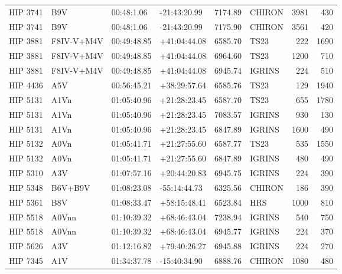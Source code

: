 \documentclass{emulateapj}
\begin{document}
\begin{longtable*}{|l|lllrlrr|}
    HIP 3741 &            B9V &     00:48:1.06 &   -21:43:20.99 &  7174.89 &     CHIRON &     3981 &     430 \\
    HIP 3741 &            B9V &     00:48:1.06 &   -21:43:20.99 &  7175.90 &     CHIRON &     3561 &     420 \\
    HIP 3881 &     F8IV-V+M4V &    00:49:48.85 &   +41:04:44.08 &  6585.70 &       TS23 &      222 &    1690 \\
    HIP 3881 &     F8IV-V+M4V &    00:49:48.85 &   +41:04:44.08 &  6964.60 &       TS23 &     1200 &     710 \\
    HIP 3881 &     F8IV-V+M4V &    00:49:48.85 &   +41:04:44.08 &  6945.74 &     IGRINS &      224 &     510 \\
    HIP 4436 &            A5V &    00:56:45.21 &   +38:29:57.64 &  6585.76 &       TS23 &      129 &    1940 \\
    HIP 5131 &           A1Vn &    01:05:40.96 &   +21:28:23.45 &  6587.70 &       TS23 &      655 &    1780 \\
    HIP 5131 &           A1Vn &    01:05:40.96 &   +21:28:23.45 &  7083.57 &     IGRINS &      930 &     130 \\
    HIP 5131 &           A1Vn &    01:05:40.96 &   +21:28:23.45 &  6847.89 &     IGRINS &     1600 &     490 \\
    HIP 5132 &           A0Vn &    01:05:41.71 &   +21:27:55.60 &  6587.77 &       TS23 &      535 &    1550 \\
    HIP 5132 &           A0Vn &    01:05:41.71 &   +21:27:55.60 &  6847.89 &     IGRINS &      480 &     490 \\
    HIP 5310 &            A3V &    01:07:57.16 &   +20:44:20.83 &  6945.75 &     IGRINS &      224 &     390 \\
    HIP 5348 &        B6V+B9V &    01:08:23.08 &   -55:14:44.73 &  6325.56 &     CHIRON &      186 &     390 \\
    HIP 5361 &            B8V &    01:08:33.47 &   +58:15:48.41 &  6523.84 &        HRS &     1000 &     810 \\
    HIP 5518 &          A0Vnn &    01:10:39.32 &   +68:46:43.04 &  7238.94 &     IGRINS &      540 &     750 \\
    HIP 5518 &          A0Vnn &    01:10:39.32 &   +68:46:43.04 &  6945.77 &     IGRINS &      224 &     370 \\
    HIP 5626 &            A3V &    01:12:16.82 &   +79:40:26.27 &  6945.88 &     IGRINS &      224 &     270 \\
    HIP 7345 &            A1V &    01:34:37.78 &   -15:40:34.90 &  6888.76 &     CHIRON &     1080 &     480 \\

\end{longtable*}
\end{document}
